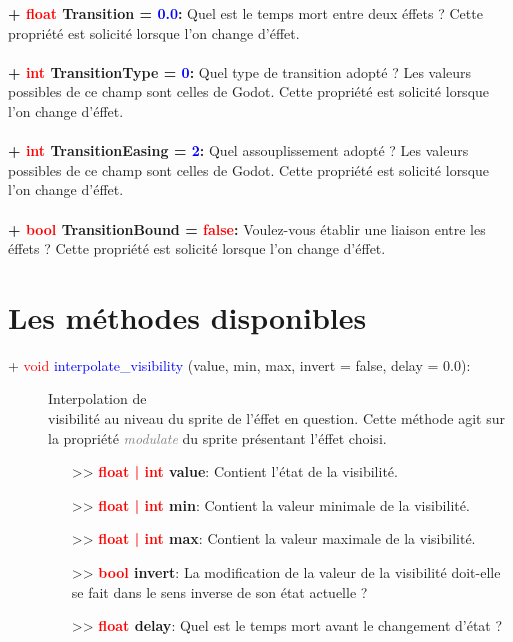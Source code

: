 \documentclass[a4paper, 11pt]{article}
\begin{document}
	\textbf{+ \textcolor{red}{float} Transition = \textcolor{blue}{0.0}:} Quel est le temps mort entre deux
	éffets ? Cette propriété est solicité lorsque l'on change d'éffet.\\\\
	\textbf{+ \textcolor{red}{int} TransitionType = \textcolor{blue}{0}:} Quel type de transition adopté ?
	Les valeurs possibles de ce champ sont celles de Godot. Cette propriété est solicité lorsque l'on change 
	d'éffet.\\\\
	\textbf{+ \textcolor{red}{int} TransitionEasing = \textcolor{blue}{2}:} Quel assouplissement adopté ? 
	Les valeurs possibles de ce champ sont celles de Godot. Cette propriété est solicité lorsque l'on change 
	d'éffet.\\\\
	\textbf{+ \textcolor{red}{bool} TransitionBound = \textcolor{red}{false}:} Voulez-vous établir une 
	liaison entre les éffets ? Cette propriété est solicité lorsque l'on change d'éffet.

	\section{Les méthodes disponibles}
	\begin{description}
		\item [+ \textcolor{red}{void} \textcolor{blue}{interpolate\_visibility} (value, min, max, invert = 
		false, delay = 0.0):] Interpolation de \\visibilité au niveau du sprite de l'éffet en question. 
		Cette méthode agit sur la propriété \textit{\textcolor{gray}{modulate}} du sprite présentant l'éffet 
		choisi.
		\begin{itemize}
			\item [>> \textbf{\textcolor{red}{float | int} value}:] Contient l'état de la visibilité.
			\item [>> \textbf{\textcolor{red}{float | int} min}:] Contient la valeur minimale de la 
			visibilité.
			\item [>> \textbf{\textcolor{red}{float | int} max}:] Contient la valeur maximale de la 
			visibilité.
			\item [>> \textbf{\textcolor{red}{bool} invert}:] La modification de la valeur de la visibilité
			doit-elle se fait dans le sens inverse de son état actuelle ?
			\item [>> \textbf{\textcolor{red}{float} delay}:] Quel est le temps mort avant le changement 
			d'état ?
		\end{itemize}
	\end{description}
\end{document}
